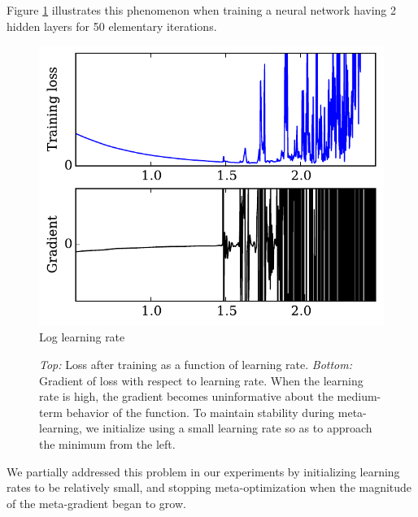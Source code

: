 \documentclass{article}
\newcommand{\primal}{elementary}
\begin{document}
Figure \ref{fig:chaos} illustrates this phenomenon when training a neural network having 2 hidden layers for 50 \primal{} iterations.
%
\begin{figure}
\begin{center}
\includegraphics[width=0.9\columnwidth]{../experiments/Jan_14_learning_rate_wiggliness/3/chaos.pdf}
\vskip -0.1in
\small Log learning rate
\caption{\emph{Top:} Loss after training as a function of learning rate.
\emph{Bottom:} Gradient of loss with respect to learning rate.
When the learning rate is high, the gradient becomes uninformative about the medium-term behavior of the function.
To maintain stability during meta-learning, we initialize using a small learning rate so as to approach the minimum from the left.}
\label{fig:chaos}
\end{center}
\vskip -0.2in
\end{figure} 
%
We partially addressed this problem in our experiments by initializing learning rates to be relatively small, and stopping meta-optimization when the magnitude of the meta-gradient began to grow.


\end{document}
